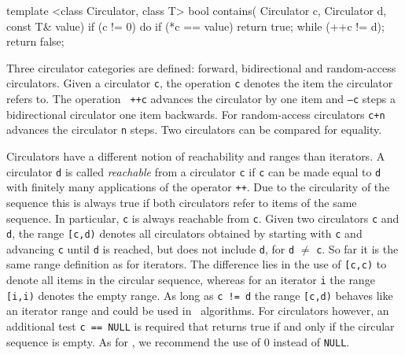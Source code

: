 \begin{ccExampleCode}
template <class Circulator, class T>
bool contains( Circulator c, Circulator d, const T& value) {
    if (c != 0) {
        do {
            if (*c == value)
                return true;
        } while (++c != d);
    }
    return false;
}
\end{ccExampleCode}

\noindent
Three circulator categories are defined: forward, bidirectional and
random-access circulators. Given a circulator {\tt c}, the operation
{\tt *c} denotes the item the circulator refers to. The operation {\tt
  ++c} advances the circulator by one item and {\tt --c} steps a
bidirectional circulator one item backwards. For random-access
circulators {\tt c+n} advances the circulator {\tt n} steps.  Two
circulators can be compared for equality.

Circulators have a different notion of reachability and ranges than
iterators. A circulator {\tt d} is called {\em reachable\/} from a
circulator {\tt c} if {\tt c} can be made equal to {\tt d} with
finitely many applications of the operator {\tt ++}. Due to the
circularity of the sequence this is always true if both circulators
refer to items of the same sequence. In particular, {\tt c} is always
reachable from {\tt c}. Given two circulators {\tt c} and {\tt d}, the
range {\tt [c,d)} denotes all circulators obtained by starting with
{\tt c} and advancing {\tt c} until {\tt d} is reached, but does not
include {\tt d}, for {\tt d} $\neq$ {\tt c}.  So far it is the same
range definition as for iterators.  The difference lies in the use of
{\tt [c,c)} to denote all items in the circular sequence, whereas for
an iterator {\tt i} the range {\tt [i,i)} denotes the empty range.  As
long as {\tt c != d} the range {\tt[c,d)} behaves like an iterator
range and could be used in \stl\ algorithms. For circulators however,
an additional test {\tt c == NULL} is required that returns true if
and only if the circular sequence is empty.  As for
\CC, we recommend the use of 0 instead of {\tt NULL}.

